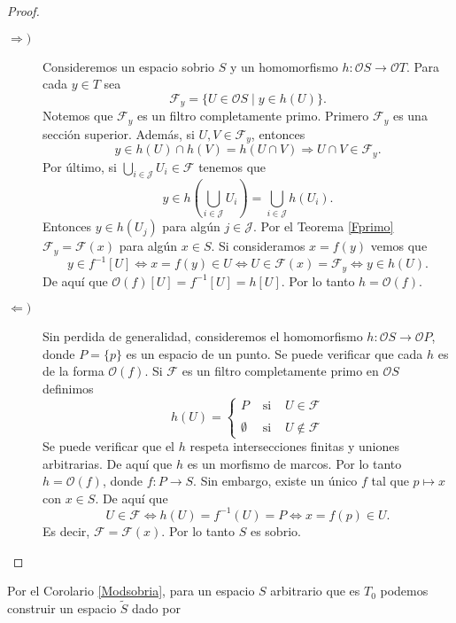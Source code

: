 \begin{proof}
    \begin{description}
        \item[$\Rightarrow )$] Consideremos un espacio sobrio $S$ y un homomorfismo $h\colon \mathcal{O}S\to \mathcal{O}T$. Para cada $y\in T$ sea 
        \[
        \mathcal{F}_y=\{U\in \mathcal{O}S\mid y\in h(U)\}.
        \]
        Notemos que $\mathcal{F}_y$ es un filtro completamente primo. Primero $\mathcal{F}_y$ es una sección superior. Además, si $U, V\in \mathcal{F}_y$, entonces
        \[
        y\in h(U)\cap h(V)=h(U\cap V)\Rightarrow U\cap V\in \mathcal{F}_y.
        \]
        Por último, si $\bigcup_{i\in\mathcal{J}}U_i\in\mathcal{F}$ tenemos que 
        \[
        y\in h(\bigcup_{i\in \mathcal{J}}U_i)=\bigcup_{i\in\mathcal{J}}h(U_i).
        \]
        Entonces $y\in h(U_j)$ para algún $j\in \mathcal{J}$. Por el Teorema \ref{Fprimo} $\mathcal{F}_y=\mathcal{F}(x)$ para algún $x\in S$. Si consideramos $x=f(y)$ vemos que 
        \[
        y\in f^{-1}[U]\Leftrightarrow x=f(y)\in U\Leftrightarrow U\in \mathcal{F}(x)=\mathcal{F}_y\Leftrightarrow y\in h(U).
        \]
        De aquí que $\mathcal{O}(f)[U]=f^{-1}[U]=h[U]$. Por lo tanto $h=\mathcal{O}(f)$.
        \item[$\Leftarrow )$] Sin perdida de generalidad, consideremos el homomorfismo $h\colon \mathcal{O}S\to \mathcal{O}P$, donde $P=\{p\}$ es un espacio de un punto. Se puede verificar que cada $h$ es de la forma $\mathcal{O}(f)$. Si 
        $\mathcal{F}$ es un filtro completamente primo en $\mathcal{O}S$ definimos 
        \[
        h(U)= \left\{ \begin{array}{lcc} P & \mbox{ si } & U\in \mathcal{F} \\ \\ \emptyset & \mbox{ si } & U\notin \mathcal{F} \end{array} \right.
        \]
        Se puede verificar que el $h$ respeta intersecciones finitas y uniones arbitrarias. De aquí que $h$ es un morfismo de marcos. Por lo tanto $h=\mathcal{O}(f)$, donde $f\colon P\to S$. Sin embargo, existe un único $f$ tal que $p\mapsto x$ con $x\in S$. De aquí que
        \[
        U\in \mathcal{F}\Leftrightarrow h(U)=f^{-1}(U)=P\Leftrightarrow x=f(p)\in U.
        \]
        Es decir, $\mathcal{F}=\mathcal{F}(x)$. Por lo tanto $S$ es sobrio.
    \end{description}
\end{proof}

Por el Corolario \ref{Modsobria}, para un espacio $S$ arbitrario que es $T_0$ podemos construir un espacio $\tilde{S}$ dado por 

